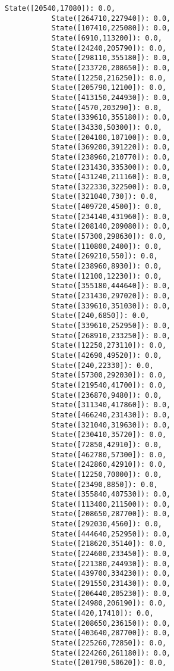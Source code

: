 \documentclass[11pt]{article}
\begin{document}
\begin{Verbatim}[commandchars=\\\{\}]
           State([20540,17080]): 0.0,
           State([264710,227940]): 0.0,
           State([107410,225080]): 0.0,
           State([6910,113200]): 0.0,
           State([24240,205790]): 0.0,
           State([298110,355180]): 0.0,
           State([233720,208650]): 0.0,
           State([12250,216250]): 0.0,
           State([205790,12100]): 0.0,
           State([413150,244930]): 0.0,
           State([4570,203290]): 0.0,
           State([339610,355180]): 0.0,
           State([34330,50300]): 0.0,
           State([204100,107100]): 0.0,
           State([369200,391220]): 0.0,
           State([238960,210770]): 0.0,
           State([231430,335300]): 0.0,
           State([431240,211160]): 0.0,
           State([322330,322500]): 0.0,
           State([321040,730]): 0.0,
           State([409720,4500]): 0.0,
           State([234140,431960]): 0.0,
           State([208140,209080]): 0.0,
           State([57300,298630]): 0.0,
           State([110800,2400]): 0.0,
           State([269210,550]): 0.0,
           State([238960,8930]): 0.0,
           State([12100,12230]): 0.0,
           State([355180,444640]): 0.0,
           State([231430,297020]): 0.0,
           State([339610,351030]): 0.0,
           State([240,6850]): 0.0,
           State([339610,252950]): 0.0,
           State([268910,233250]): 0.0,
           State([12250,273110]): 0.0,
           State([42690,49520]): 0.0,
           State([240,22330]): 0.0,
           State([57300,292030]): 0.0,
           State([219540,41700]): 0.0,
           State([236870,9480]): 0.0,
           State([311340,417860]): 0.0,
           State([466240,231430]): 0.0,
           State([321040,319630]): 0.0,
           State([230410,35720]): 0.0,
           State([72850,42910]): 0.0,
           State([462780,57300]): 0.0,
           State([242860,42910]): 0.0,
           State([12250,70000]): 0.0,
           State([23490,8850]): 0.0,
           State([355840,407530]): 0.0,
           State([113400,211500]): 0.0,
           State([208650,287700]): 0.0,
           State([292030,4560]): 0.0,
           State([444640,252950]): 0.0,
           State([218620,35140]): 0.0,
           State([224600,233450]): 0.0,
           State([221380,244930]): 0.0,
           State([439700,334230]): 0.0,
           State([291550,231430]): 0.0,
           State([206440,205230]): 0.0,
           State([24980,206190]): 0.0,
           State([420,17410]): 0.0,
           State([208650,236150]): 0.0,
           State([403640,287700]): 0.0,
           State([225260,72850]): 0.0,
           State([224260,261180]): 0.0,
           State([201790,50620]): 0.0,

\end{Verbatim}
\end{document}
